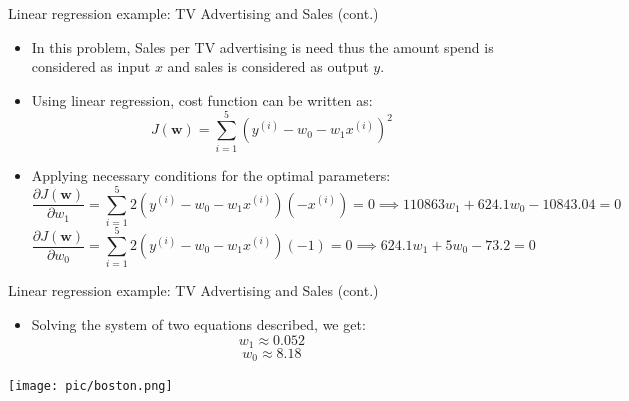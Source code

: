 \documentclass[serif, aspectratio=169]{beamer}
\begin{document}
\begin{frame}{Linear regression example: TV Advertising and Sales (cont.)}
    \begin{itemize}
        \item In this problem, Sales per TV advertising is need thus the amount spend is considered as input \( x \) and sales is considered as output \( y \). 
        \item Using linear regression, cost function can be written as:
        \[
        J(\mathbf{w}) = \sum_{i=1}^{5} \left( y^{(i)} - w_0 - w_1 x^{(i)} \right)^2
        \]
        \item Applying necessary conditions for the optimal parameters:
        \[ 
        \frac{\partial J(\mathbf{w})}{\partial w_1} = \sum_{i=1}^{5} 2 \left( y^{(i)} - w_0 - w_1 x^{(i)} \right) (-x^{(i)}) = 0 \implies 110863 w_1 + 624.1 w_0 - 10843.04 = 0
        \]
        \[
        \frac{\partial J(\mathbf{w})}{\partial w_0} = \sum_{i=1}^{5} 2 \left( y^{(i)} - w_0 - w_1 x^{(i)} \right) (-1) = 0 \implies 624.1 w_1 + 5 w_0 - 73.2 = 0
        \]
    \end{itemize}
\end{frame}





\begin{frame}{Linear regression example: TV Advertising and Sales (cont.)}
\begin{minipage}{0.4\textwidth}
    \begin{itemize}
        \item Solving the system of two equations described, we get:
        \[ w_1 \approx 0.052 \]
        \[ w_0 \approx 8.18 \]
    \end{itemize}
\end{minipage}%
\begin{minipage}{0.55\textwidth}
\centering
\texttt{[image: pic/boston.png]}
\end{minipage}

\end{frame}
\end{document}
